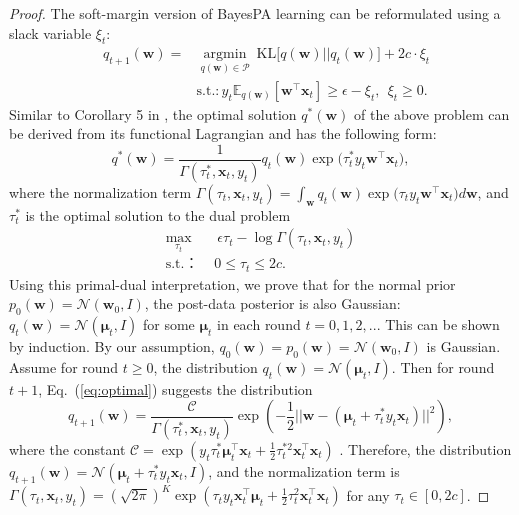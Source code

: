 \documentclass[twoside,11pt]{article}
\newcommand{\xv}{\bm{x}}
\newcommand{\wv}{\bm{w}}
\newcommand{\muv}{\bm \mu}
\newcommand{\normal}{\mathcal{N}}
\begin{document}
%
\begin{proof}
The soft-margin version of BayesPA learning can be reformulated using a slack variable $\xi_t$:
\setlength\arraycolsep{1pt} \begin{equation}\label{eq:onlinepa_reg_app}
\begin{array}{ccc}
& q_{t+1}(\bm{w}) = & \underset{q(\bm{w}) \in \mathcal{P}}{\operatorname{argmin}} ~\text{KL}\Big[ q(\wv) || q_t(\wv) \Big] + 2 c \cdot \xi_t \\
&& \text{s.t.}: y_t \mathbb{E}_{q(\wv)}\left[ {\wv}^\top \xv_t \right] \geq \epsilon-\xi_t, ~~ \xi_t \geq 0.
\end{array}
\end{equation}
Similar to Corollary 5 in \citep{zhu2012medlda}, the optimal solution $q^*(\wv)$ of the above problem can be derived from its functional Lagrangian  and has the following form:
\begin{equation}
\label{eq:optimal}
q^*(\wv) = \frac{1}{\Gamma(\tau_t^*, \xv_t, y_t)} q_t(\wv) \exp\Big( \tau_t^* y_t \wv^\top \xv_t \Big),
\end{equation}
where the normalization term $\Gamma(\tau_t, \xv_t, y_t) = \int_{\wv}{q_t(\wv) \exp\Big(\tau_t y_t \wv^\top \xv_t \Big)d\wv}$, and $\tau_t^*$ is the optimal solution to the dual problem
\begin{equation}
\begin{array}{rl}
\label{eq:dual}
\max\limits_{\tau_t} & {~\epsilon\tau_t-\log \Gamma(\tau_t, \xv_t, y_t)} \\
\text{s.t.： } &  0 \leq \tau_t \leq 2 c .
\end{array}
\end{equation}
Using this primal-dual interpretation, we prove that for the normal prior $p_0(\bm{w}) = \mathcal{N}(\bm{w}_0, I)$, the post-data posterior is also Gaussian: $q_t(\bm{w}) = \mathcal{N}(\muv_t, I)$ for some $\muv_t$ in each round $t = 0, 1, 2, ...$ This can be shown by induction. By our assumption, $q_0(\wv) = p_0(\wv) = \normal(\wv_0, I)$ is Gaussian. Assume for round $t \geq 0$, the distribution $q_{t}(\wv) = \mathcal{N}(\muv_{t}, I)$. Then for round $t+1$, Eq.~(\ref{eq:optimal}) suggests the distribution
\begin{equation*}
q_{t+1}(\wv) = \frac{\mathcal{C}}{\Gamma(\tau_t^*, \xv_t, y_t)} \exp\left( -\frac{1}{2} ||\wv-(\muv_t+\tau_t^* y_t \xv_t)||^2 \right),
\end{equation*}
where the constant $\mathcal{C} = \exp(y_t \tau_t^* \muv_t^\top \xv_t  + \frac{1}{2} \tau_t^{*2} \xv_t^\top \xv_t)$ . Therefore, the distribution $q_{t+1}(\wv) = \mathcal{N}(\muv_t + \tau_t^* y_t \xv_t, I)$, and the normalization term is $\Gamma(\tau_t, \xv_t, y_t) = (\sqrt{2 \pi})^K \exp(\tau_t y_t \xv_t^\top \muv_t+\frac{1}{2} \tau_t^{2} \xv_t^\top \xv_t)$ for any $\tau_t \in [0, 2c]$.


\end{proof}
\end{document}
